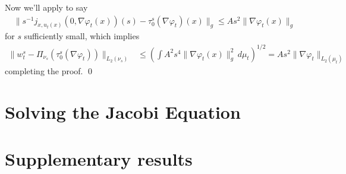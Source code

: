 \documentclass{article}
\begin{document}
Now we'll apply  to say 
\begin{align*}
    \|s^{-1}j_{x, u_t(x)}\left(0, \nabla \varphi_t(x)\right)(s)  - \tau_0^s(\nabla \varphi_t)(x)\|_g \leq As^2\|\nabla\varphi_t(x)\|_g
\end{align*}
for $s$ sufficiently small, which implies 
\begin{align*}
    \|w_t^s - \Pi_{\nu_s}(\tau_0^s(\nabla\varphi_t))\|_{L_2(\nu_s)} &\leq \left(\int A^2s^4\|\nabla \varphi_t(x)\|_g^2 \,d\mu_t\right)^{1/2}  = As^2\|\nabla\varphi_t\|_{L_2(\mu_t)}
\end{align*}
completing the proof.
\qed{}

\section{Solving the Jacobi Equation} \label{sec: solving the jacobi equation}

\section{Supplementary results}
\end{document}
